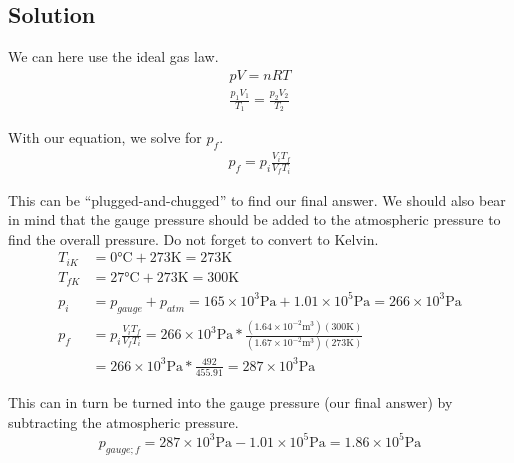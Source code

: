 \documentclass[12pt]{article}
\begin{document}
        \subsection{Solution}
            We can here use the ideal gas law.
            \begin{gather}
                pV = nRT\\
                \frac{p_1 V_1}{T_1} =   \frac{p_2 V_2}{T_2}
            \end{gather}

            With our equation, we solve for $p_f$. 
            \begin{gather}
                p_f =   p_i \frac{V_i T_f}{V_f T_i}
            \end{gather}

            This can be ``plugged-and-chugged'' to find our final answer.
            We should also bear in mind that the gauge pressure should be added to the atmospheric pressure to find the overall pressure.
            Do not forget to convert to Kelvin.
            \begin{align}
                T_{iK}  &=  0 \unit{\celsius} + 273 \unit{\kelvin}
                    =   273 \unit{\kelvin}\\
                T_{fK}  &=  27 \unit{\celsius} + 273 \unit{\kelvin}
                    =   300 \unit{\kelvin}\\
                p_i &=  p_{gauge} + p_{atm}
                    =   165 \times 10^3 \unit{\pascal} + 1.01 \times 10^5 \unit{\pascal}
                    =   266 \times 10^3 \unit{\pascal}\\
                p_f &=  p_i \frac{V_i T_f}{V_f T_i}
                    =   266 \times 10^3 \unit{\pascal} * \frac{(1.64 \times 10^{-2} \unit{\meter^3}) (300 \unit{\kelvin})}{(1.67 \times 10^{-2} \unit{\meter^3}) (273 \unit{\kelvin})}\\
                    &=  266 \times 10^3 \unit{\pascal} * \frac{492}{455.91}
                    =   287 \times 10^3 \unit{\pascal}
            \end{align}

            This can in turn be turned into the gauge pressure (our final answer) by subtracting the atmospheric pressure.
            \begin{equation}
                p_{gauge;f} =   287 \times 10^{3} \unit{\pascal} - 1.01 \times 10^5 \unit{\pascal}
                    =   \boxed{1.86 \times 10^5 \unit{\pascal}}
            \end{equation}
\end{document}
